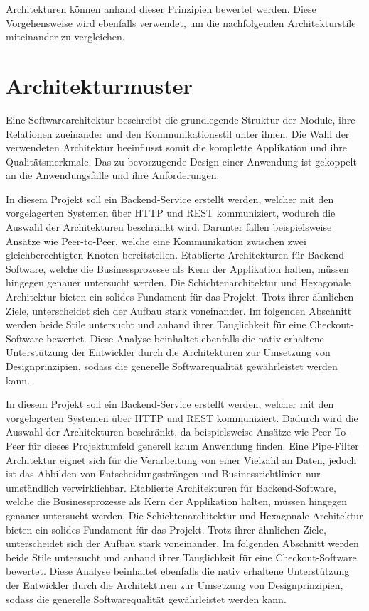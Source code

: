 Architekturen können anhand dieser Prinzipien bewertet werden. Diese Vorgehensweise wird ebenfalls verwendet, um die nachfolgenden Architekturstile miteinander zu vergleichen. 

\section{Architekturmuster}

Eine Softwarearchitektur beschreibt die grundlegende Struktur der Module, ihre Relationen zueinander und den Kommunikationsstil unter ihnen. Die Wahl der verwendeten Architektur beeinflusst somit die komplette Applikation und ihre Qualitätsmerkmale. Das zu bevorzugende Design einer Anwendung ist gekoppelt an die Anwendungsfälle und ihre Anforderungen. 

In diesem Projekt soll ein Backend-Service erstellt werden, welcher mit den vorgelagerten Systemen über \acrshort{HTTP} und \acrshort{REST} kommuniziert, wodurch die Auswahl der Architekturen beschränkt wird. Darunter fallen beispielsweise Ansätze wie Peer-to-Peer, welche eine Kommunikation zwischen zwei gleichberechtigten Knoten bereitstellen. Etablierte Architekturen für Backend-Software, welche die Businessprozesse als Kern der Applikation halten, müssen hingegen genauer untersucht werden. Die Schichtenarchitektur und Hexagonale Architektur bieten ein solides Fundament für das Projekt. Trotz ihrer ähnlichen Ziele, unterscheidet sich der Aufbau  stark voneinander. Im folgenden Abschnitt werden beide Stile untersucht und anhand ihrer Tauglichkeit für eine Checkout-Software bewertet. Diese Analyse beinhaltet ebenfalls die nativ erhaltene Unterstützung der Entwickler durch die Architekturen zur Umsetzung von Designprinzipien, sodass die generelle Softwarequalität gewährleistet werden kann. 

In diesem Projekt soll ein Backend-Service erstellt werden, welcher mit den vorgelagerten Systemen über \acrshort{HTTP} und \acrshort{REST} kommuniziert. Dadurch wird die Auswahl der Architekturen beschränkt, da beispielsweise Ansätze wie Peer-To-Peer für dieses Projektumfeld generell kaum Anwendung finden. Eine Pipe-Filter Architektur eignet sich für die Verarbeitung von einer Vielzahl an Daten, jedoch ist das Abbilden von Entscheidungssträngen und Businessrichtlinien nur umständlich verwirklichbar. Etablierte Architekturen für Backend-Software, welche die Businessprozesse als Kern der Applikation halten, müssen hingegen genauer untersucht werden. Die Schichtenarchitektur und Hexagonale Architektur bieten ein solides Fundament für das Projekt. Trotz ihrer ähnlichen Ziele, unterscheidet sich der Aufbau  stark voneinander. Im folgenden Abschnitt werden beide Stile untersucht und anhand ihrer Tauglichkeit für eine Checkout-Software bewertet. Diese Analyse beinhaltet ebenfalls die nativ erhaltene Unterstützung der Entwickler durch die Architekturen zur Umsetzung von Designprinzipien, sodass die generelle Softwarequalität gewährleistet werden kann. 

